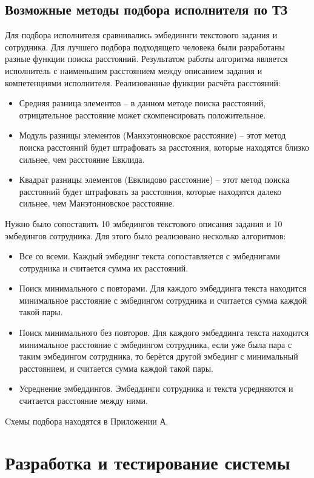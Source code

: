 \documentclass[PI,KR]{HSEUniversity}
\begin{document}
\section{Возможные методы подбора исполнителя по ТЗ}
Для подбора исполнителя сравнивались эмбединнги текстового задания и сотрудника. Для лучшего подбора подходящего человека были разработаны разные функции поиска расстояний. Результатом работы алгоритма является исполнитель с наименьшим расстоянием между описанием задания и компетенциями исполнителя. Реализованные функции расчёта расстояний:
\begin{itemize}
	\item Средняя разница элементов -- в данном методе поиска расстояний, отрицательное расстояние может скомпенсировать положительное.
	\item Модуль разницы элементов (Манхэтонновское расстояние) -- этот метод поиска расстояний будет штрафовать за расстояния, которые находятся близко сильнее, чем расстояние Евклида.
	\item Квадрат разницы элементов  (Евклидово расстояние) --  этот метод поиска расстояний будет штрафовать за расстояния, которые находятся далеко сильнее, чем Манэтонновское расстояние.
\end{itemize}
Нужно было сопоставить 10 эмбедингов текстового описания задания и 10 эмбедингов сотрудника. Для этого было реализовано несколько алгоритмов:
\begin{itemize}
	\item Все со всеми. Каждый эмбединг текста сопоставляется с эмбеднигами сотрудника и считается сумма их расстояний.
	\item Поиск минимального с повторами. Для каждого эмбеддинга текста находится минимальное расстояние с эмбедингом сотрудника и считается сумма каждой такой пары.
	\item Поиск минимального без повторов. Для каждого эмбеддинга текста находится минимальное расстояние с эмбедингом сотрудника, если уже была пара с таким эмбедингом сотрудника, то берётся другой эмбединг с минимальный расстоянием, и считается сумма каждой такой пары.
	\item Усреднение эмбеддингов. Эмбеддинги сотрудника и текста усредняются и считается расстояние между ними.
\end{itemize}
Cхемы подбора находятся в Приложении А.
\chapter{Разработка и тестирование системы}
\end{document}
